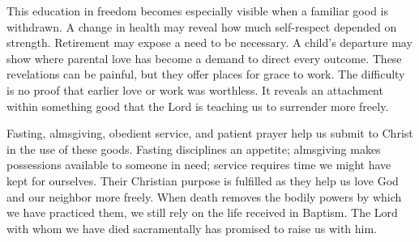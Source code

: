 This education in freedom becomes especially visible when a familiar good is withdrawn. A change in health may reveal how much self-respect depended on strength. Retirement may expose a need to be necessary. A child's departure may show where parental love has become a demand to direct every outcome. These revelations can be painful, but they offer places for grace to work. The difficulty is no proof that earlier love or work was worthless. It reveals an attachment within something good that the Lord is teaching us to surrender more freely.

Fasting, almsgiving, obedient service, and patient prayer help us submit to Christ in the use of these goods. Fasting disciplines an appetite; almsgiving makes possessions available to someone in need; service requires time we might have kept for ourselves. Their Christian purpose is fulfilled as they help us love God and our neighbor more freely. When death removes the bodily powers by which we have practiced them, we still rely on the life received in Baptism. The Lord with whom we have died sacramentally has promised to raise us with him.

